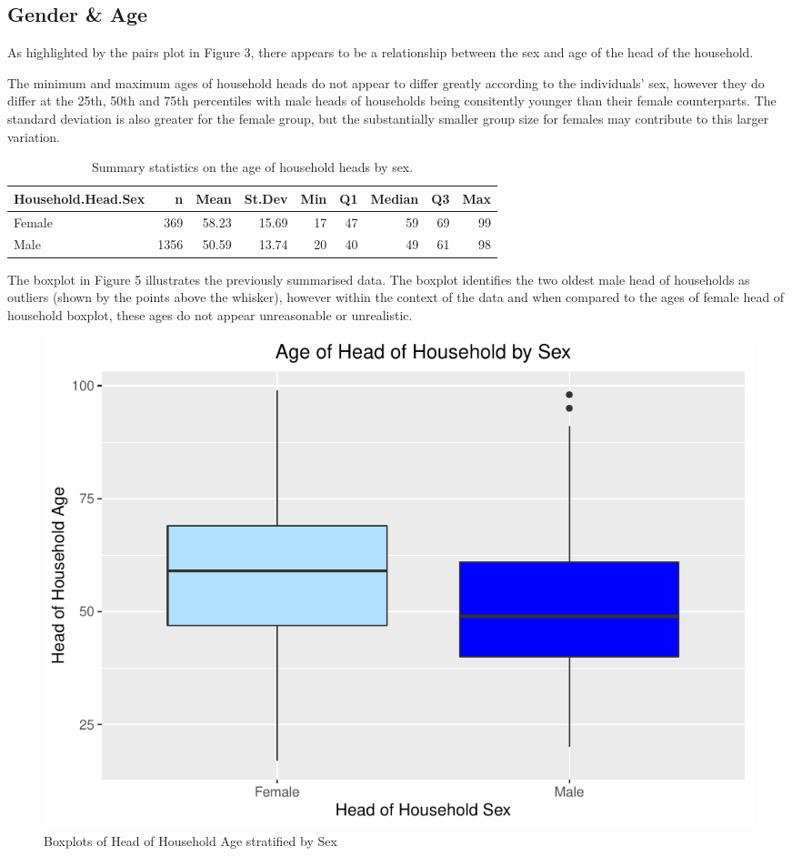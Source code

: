 \documentclass[
]{article}
\begin{document}
\hypertarget{gender-age}{%
\subsection{Gender \& Age}\label{gender-age}}

As highlighted by the pairs plot in Figure 3, there appears to be a
relationship between the sex and age of the head of the household.

The minimum and maximum ages of household heads do not appear to differ
greatly according to the individuals' sex, however they do differ at the
25th, 50th and 75th percentiles with male heads of households being
consitently younger than their female counterparts. The standard
deviation is also greater for the female group, but the substantially
smaller group size for females may contribute to this larger variation.

\begin{table}[!h]

\caption{\label{tab:summaries of age by sex}Summary statistics on the age of household heads by sex.}
\centering
\begin{tabular}[t]{l|r|r|r|r|r|r|r|r}
\hline
Household.Head.Sex & n & Mean & St.Dev & Min & Q1 & Median & Q3 & Max\\
\hline
Female & 369 & 58.23 & 15.69 & 17 & 47 & 59 & 69 & 99\\
\hline
Male & 1356 & 50.59 & 13.74 & 20 & 40 & 49 & 61 & 98\\
\hline
\end{tabular}
\end{table}

The boxplot in Figure 5 illustrates the previously summarised data. The
boxplot identifies the two oldest male head of households as outliers
(shown by the points above the whisker), however within the context of
the data and when compared to the ages of female head of household
boxplot, these ages do not appear unreasonable or unrealistic.

\begin{figure}

{\centering \includegraphics[width=0.8\linewidth]{Group_01_files/figure-latex/boxplot of age by gender-1} 

}

\caption{Boxplots of Head of Household Age stratified by Sex}\label{fig:boxplot of age by gender}
\end{figure}
\end{document}
